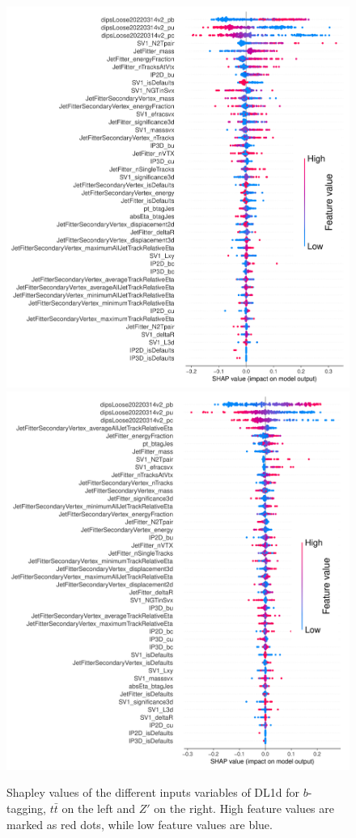 \begin{figure}
  \centering
  \includegraphics[scale=0.7]{Images/FTAG/DL1d/Shap/ttb.png}
  \includegraphics[scale=0.7]{Images/FTAG/DL1d/Shap/zpb.png}
  \caption{Shapley values of the different inputs variables of DL1d for $b$-tagging, $t\bar{t}$ on the left and $Z'$ on the right. High feature values are marked as red dots, while low feature values are blue.} 
  \label{fig:DL1dshapb}
\end{figure} 


